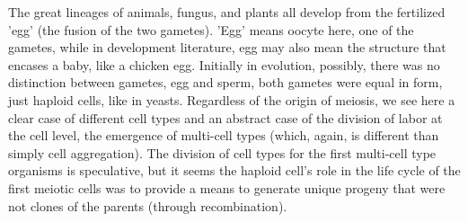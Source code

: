 The great lineages of animals, fungus, and plants all develop from the fertilized 'egg' (the fusion of the two gametes).  'Egg' means oocyte here, one of the gametes, while in development literature, egg may also mean the structure that encases a baby, like a chicken egg.  Initially in evolution, possibly, there was no distinction between gametes, egg and sperm, both gametes were equal in form, just haploid cells, like in yeasts.  Regardless of the origin of meiosis, we see here a clear case of different cell types and an abstract case of the division of labor at the cell level, the emergence of multi-cell types (which, again, is different than simply cell aggregation).  The division of cell types for the first multi-cell type organisms is speculative, but it seems the haploid cell's role in the life cycle of the first meiotic cells was to provide a means to generate unique progeny that were not clones of the parents (through recombination).   

